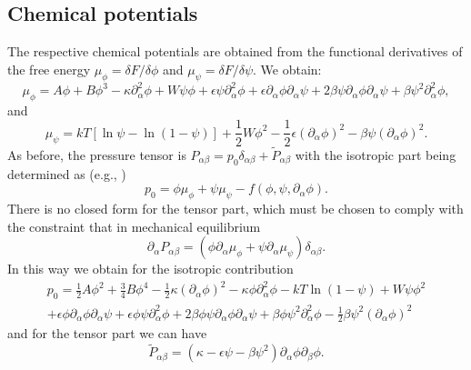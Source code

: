 \subsection{Chemical potentials}

The respective chemical potentials are obtained from the functional
derivatives of the free energy $\mu_\phi = \delta F / \delta \phi$ and
$\mu_\psi = \delta F / \delta \psi$. We obtain:
\begin{equation}
\mu_\phi =
A\phi + B\phi^3 -\kappa \partial_\alpha^2 \phi
+ W\psi\phi + \epsilon\psi\partial_\alpha^2 \phi
+ \epsilon \partial_\alpha \phi \partial_\alpha \psi
+ 2\beta \psi\partial_\alpha\phi \partial_\alpha \psi
+ \beta \psi^2 \partial_\alpha^2 \phi,
\end{equation}
and
\begin{equation}
\mu_\psi = kT \left[ \ln\psi - \ln(1-\psi) \right]
+ {\textstyle \frac{1}{2}}W\phi^2
- {\textstyle \frac{1}{2}}\epsilon (\partial_\alpha \phi)^2
- \beta\psi (\partial_\alpha \phi)^2.
\end{equation}
As before, the pressure tensor is $P_{\alpha\beta} = p_0\delta_{\alpha\beta}
+ \tilde{P}_{\alpha\beta}$ with the isotropic part being determined as (e.g.,
\cite{theissengompper})
\begin{equation}
p_0 = \phi \mu_\phi + \psi \mu_\psi - f(\phi, \psi, \partial_\alpha \phi).
\end{equation}
There is no closed form for the tensor part, which must be chosen to
comply with the constraint that in mechanical equilibrium
\begin{equation}
\partial_\alpha P_{\alpha\beta} = (\phi\partial_\alpha\mu_\phi +
\psi\partial_\alpha\mu_\psi)\delta_{\alpha\beta}.
\end{equation}
In this way we obtain for the isotropic contribution
\begin{eqnarray}
p_0 = {\textstyle \frac{1}{2}}A\phi^2 + {\textstyle \frac{3}{4}}B\phi^4 
- {\textstyle\frac{1}{2}}\kappa (\partial_\alpha\phi)^2 
- \kappa \phi \partial_\alpha^2 \phi
- kT \ln(1-\psi) + W\psi\phi^2
\nonumber\\
+ \epsilon \phi \partial_\alpha \phi \partial_\alpha \psi
+ \epsilon\phi\psi \partial_\alpha^2 \phi
+ 2 \beta\phi\psi \partial_\alpha \phi \partial_\alpha\psi
+ \beta \phi \psi^2 \partial_\alpha^2 \phi
- {\textstyle\frac{1}{2}} \beta \psi^2 (\partial_\alpha \phi)^2
\end{eqnarray}
and for the tensor part we can have
\begin{equation}
\tilde{P}_{\alpha\beta} =
(\kappa - \epsilon \psi - \beta\psi^2) 
\partial_\alpha \phi \partial_\beta \phi.
\end{equation}




